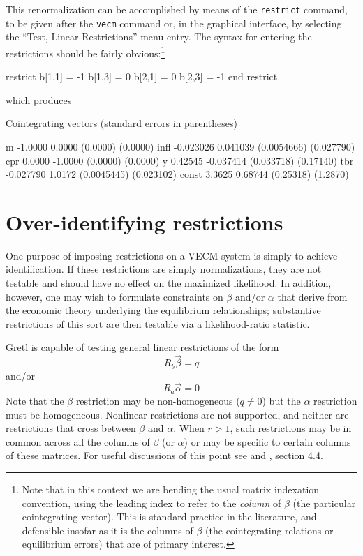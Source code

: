 This renormalization can be accomplished by means of the
\texttt{restrict} command, to be given after the \texttt{vecm} command
or, in the graphical interface, by selecting the ``Test, Linear
Restrictions'' menu entry. The syntax for entering the restrictions
should be fairly obvious:\footnote{Note that in this context we are
  bending the usual matrix indexation convention, using the leading
  index to refer to the \textit{column} of $\beta$ (the particular
  cointegrating vector).  This is standard practice in the literature,
  and defensible insofar as it is the columns of $\beta$ (the
  cointegrating relations or equilibrium errors) that are of primary
  interest.}
\begin{code}
restrict
  b[1,1] = -1
  b[1,3] = 0
  b[2,1] = 0
  b[2,3] = -1
end restrict
\end{code}
which produces

\begin{code}
Cointegrating vectors (standard errors in parentheses)

m          -1.0000       0.0000 
           (0.0000)     (0.0000) 
infl     -0.023026     0.041039 
        (0.0054666)   (0.027790) 
cpr         0.0000      -1.0000 
           (0.0000)     (0.0000) 
y          0.42545    -0.037414 
         (0.033718)    (0.17140) 
tbr      -0.027790       1.0172 
        (0.0045445)   (0.023102) 
const       3.3625      0.68744 
          (0.25318)     (1.2870) 
\end{code}

\section{Over-identifying restrictions}
\label{sec:johansen-overid}

One purpose of imposing restrictions on a VECM system is simply to
achieve identification.  If these restrictions are simply
normalizations, they are not testable and should have no effect on the
maximized likelihood.  In addition, however, one may wish to formulate
constraints on $\beta$ and/or $\alpha$ that derive from the economic
theory underlying the equilibrium relationships; substantive
restrictions of this sort are then testable via a likelihood-ratio
statistic.

Gretl is capable of testing general linear restrictions of the form
\begin{equation}
\label{eq:Rb}
R_b \vec{\beta} = q
\end{equation}
and/or
\begin{equation}
\label{eq:Ra}
R_a \vec{\alpha} = 0
\end{equation}
%
Note that the $\beta$ restriction may be non-homogeneous ($q \neq 0$)
but the $\alpha$ restriction must be homogeneous.  Nonlinear
restrictions are not supported, and neither are restrictions that
cross between $\beta$ and $\alpha$.  When $r > 1$, such restrictions
may be in common across all the columns of $\beta$ (or $\alpha$) or
may be specific to certain columns of these matrices. For useful
discussions of this point see \cite{boswijk95} and
\cite{boswijk-doornik04}, section 4.4.

